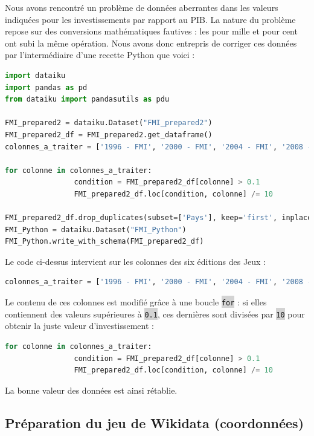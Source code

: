 \documentclass[hidelinks, 12pt]{report}
\newcommand{\code}[1]{\colorbox{LightGray}{\texttt{#1}}}
\begin{document}
Nous avons rencontré un problème de données aberrantes dans les valeurs indiquées pour les investissements par rapport au PIB. La nature du problème repose sur des conversions mathématiques fautives : les pour mille et pour cent ont subi la même opération. Nous avons donc entrepris de corriger ces données par l'intermédiaire d'une recette Python que voici :

\begin{lstlisting}[language=python]
import dataiku
import pandas as pd
from dataiku import pandasutils as pdu

FMI_prepared2 = dataiku.Dataset("FMI_prepared2")
FMI_prepared2_df = FMI_prepared2.get_dataframe()
colonnes_a_traiter = ['1996 - FMI', '2000 - FMI', '2004 - FMI', '2008 - FMI', '2012 - FMI', '2016 - FMI']

for colonne in colonnes_a_traiter:
				condition = FMI_prepared2_df[colonne] > 0.1
				FMI_prepared2_df.loc[condition, colonne] /= 10

FMI_prepared2_df.drop_duplicates(subset=['Pays'], keep='first', inplace=True)
FMI_Python = dataiku.Dataset("FMI_Python")
FMI_Python.write_with_schema(FMI_prepared2_df)
\end{lstlisting}

Le code ci-dessus intervient sur les colonnes des six éditions des Jeux :

\begin{lstlisting}[language=python]	
colonnes_a_traiter = ['1996 - FMI', '2000 - FMI', '2004 - FMI', '2008 - FMI', '2012 - FMI', '2016 - FMI']
\end{lstlisting}

Le contenu de ces colonnes est modifié grâce à une boucle \code{for} : si elles contiennent des valeurs supérieures à \code{0.1}, ces dernières sont divisées par \code{10} pour obtenir la juste valeur d'investissement :

\begin{lstlisting}[language=python]
for colonne in colonnes_a_traiter:
				condition = FMI_prepared2_df[colonne] > 0.1
				FMI_prepared2_df.loc[condition, colonne] /= 10
\end{lstlisting}

La bonne valeur des données est ainsi rétablie.





%





\subsection{Préparation du jeu de Wikidata (coordonnées)}
\end{document}
